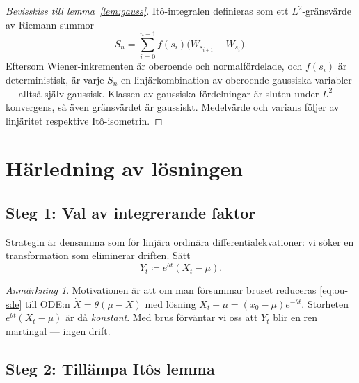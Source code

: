 \documentclass[11pt,a4paper]{article}
\theoremstyle{plain}
\theoremstyle{definition}
\theoremstyle{remark}
\newtheorem*{remark}{Anmärkning}
\begin{document}
\begin{proof}[Bevisskiss till lemma~\ref{lem:gauss}]
Itô-integralen definieras som ett $L^2$-gränsvärde av Riemann-summor
\[
    S_n = \sum_{i=0}^{n-1} f(s_i)\bigl(W_{s_{i+1}} - W_{s_i}\bigr).
\]
Eftersom Wiener-inkrementen är oberoende och normalfördelade, och $f(s_i)$ är deterministisk, är varje $S_n$ en linjärkombination av oberoende gaussiska variabler --- alltså själv gaussisk. Klassen av gaussiska fördelningar är sluten under $L^2$-konvergens, så även gränsvärdet är gaussiskt. Medelvärde och varians följer av linjäritet respektive Itô-isometrin.
\end{proof}

\section{Härledning av lösningen}

\subsection*{Steg 1: Val av integrerande faktor}

Strategin är densamma som för linjära ordinära differentialekvationer: vi söker en transformation som eliminerar driften. Sätt
\begin{equation}
    Y_t \coloneqq e^{\theta t}(X_t - \mu).
    \label{eq:Y-def}
\end{equation}

\begin{remark}
Motivationen är att om man försummar bruset reduceras \eqref{eq:ou-sde} till ODE:n $\dot X = \theta(\mu - X)$ med lösning $X_t - \mu = (x_0 - \mu)e^{-\theta t}$. Storheten $e^{\theta t}(X_t - \mu)$ är då \emph{konstant}. Med brus förväntar vi oss att $Y_t$ blir en ren martingal --- ingen drift.
\end{remark}

\subsection*{Steg 2: Tillämpa Itôs lemma}
\end{document}
